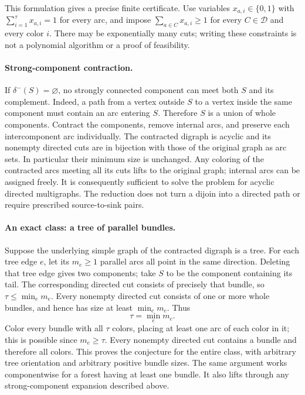 \documentclass[11pt,a4paper]{article}
\begin{document}
This formulation gives a precise finite certificate. Use variables
$x_{a,i}\in\{0,1\}$ with $\sum_{i=1}^{\tau}x_{a,i}=1$ for every arc,
and impose $\sum_{a\in C}x_{a,i}\geq1$ for every $C\in\mathcal D$ and
every color $i$. There may be exponentially many cuts; writing these
constraints is not a polynomial algorithm or a proof of feasibility.

\paragraph{Strong-component contraction.}
If $\delta^-(S)=\varnothing$, no strongly connected component can meet
both $S$ and its complement. Indeed, a path from a vertex outside $S$
to a vertex inside the same component must contain an arc entering $S$.
Therefore $S$ is a union of whole components. Contract the components,
remove internal arcs, and preserve each intercomponent arc individually.
The contracted digraph is acyclic and its nonempty directed cuts are
in bijection with those of the original graph as arc sets. In
particular their minimum size is unchanged. Any coloring of the
contracted arcs meeting all its cuts lifts to the original graph;
internal arcs can be assigned freely. It is consequently sufficient
to solve the problem for acyclic directed multigraphs. The reduction
does not turn a dijoin into a directed path or require prescribed
source-to-sink pairs.

\paragraph{An exact class: a tree of parallel bundles.}
Suppose the underlying simple graph of the contracted digraph is a
tree. For each tree edge $e$, let its $m_e\geq1$ parallel arcs all
point in the same direction. Deleting that tree edge gives two
components; take $S$ to be the component containing its tail. The
corresponding directed cut consists of precisely that bundle, so
$\tau\leq\min_e m_e$. Every nonempty directed cut consists of one or
more whole bundles, and hence has size at least $\min_e m_e$. Thus
\[
 \tau=\min_e m_e.
\]
Color every bundle with all $\tau$ colors, placing at least one arc
of each color in it; this is possible since $m_e\geq\tau$. Every
nonempty directed cut contains a bundle and therefore all colors.
This proves the conjecture for the entire class, with arbitrary tree
orientation and arbitrary positive bundle sizes. The same argument
works componentwise for a forest having at least one bundle. It also
lifts through any strong-component expansion described above.
\end{document}
